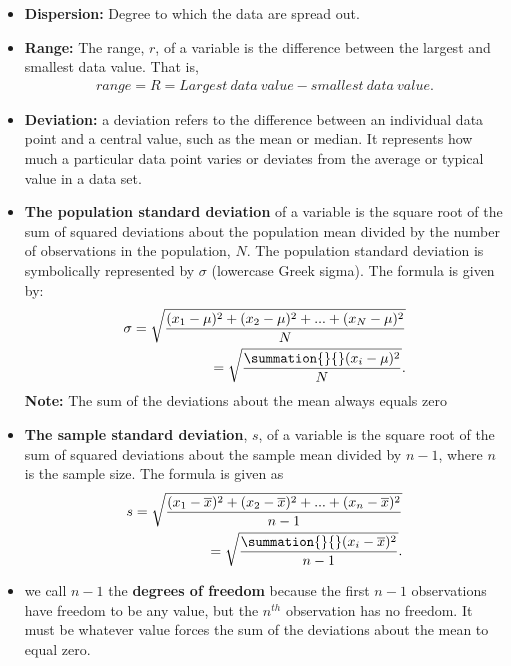 \documentclass{report}
\begin{document}
        \begin{itemize}
            \item \textbf{Dispersion:} Degree to which the data are spread out. 
            \item \textbf{Range:} The range, $r $, of a variable is the difference between the largest and smallest data value. That is,
                \begin{align*}
                    range = R = Largest\ data\ value- smallest\ data\ value
                .\end{align*}
            \item \textbf{Deviation:} a deviation refers to the difference between an individual data point and a central value, such as the mean or median. It represents how much a particular data point varies or deviates from the average or typical value in a data set.
            \item \textbf{The population standard deviation} of a variable is the square root of the sum of squared deviations about the population mean divided by the number of observations in the population, $N$. The population standard deviation is symbolically represented by $\sigma$ (lowercase Greek sigma). The formula is given by:
                \begin{align*}
                    \sigma = \sqrt{\frac{(x_{1} - \mu)^{2} + (x_{2}-\mu)^{2}+...+(x_{N}-\mu)^{2}}{N}} \\
                    = \sqrt{\frac{\summation{}{}(x_{i}-\mu)^{2} }{N}}
                .\end{align*}
                \textbf{Note:} The sum of the deviations about the mean always equals zero
            \item \textbf{The sample standard deviation}, $s $, of a variable is the square root of the sum of squared deviations about the sample mean divided by $n-1 $, where $n$  is the sample size. The formula is given as
                \begin{align*}
                    s = \sqrt{\frac{(x_{1} - \overline{x})^{2}+(x_{2}-\overline{x})^{2}+...+(x_{n}-\overline{x})^{2}}{n-1}}\\
                    = \sqrt{\frac{\summation{}{}(x_{i}-\overline{x})^{2}}{n-1}}
                .\end{align*}
            \item  we call $n-1$ the \textbf{degrees of freedom} because the first $n-1 $  observations have freedom to be any value, but the $n^{th}$ observation has no freedom. It must be whatever value forces the sum of the deviations about the mean to equal zero.

        \end{itemize}
\end{document}
